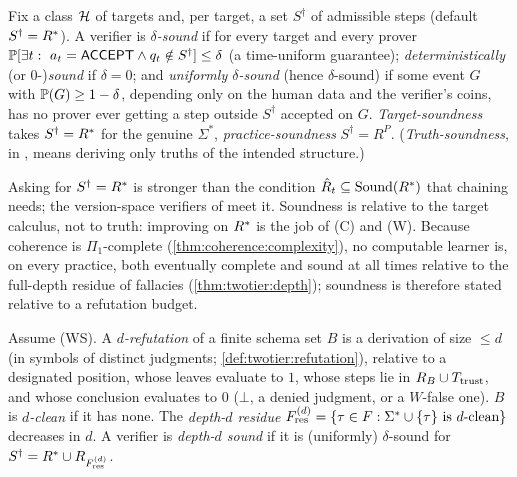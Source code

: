 \begin{definition}[Soundness]\label{def:setting:soundness}
Fix a class $\mathcal{H}$ of targets and, per target, a set $S^\dagger$ of admissible steps
(default $S^\dagger=R^{*}$). A verifier is \emph{$\delta$-sound} if for every
target and every prover
$\mathbb{P}[\exists t:\ a_t=\textsf{ACCEPT}\wedge q_t\notin S^\dagger]\le\delta$ (a
time-uniform guarantee); \emph{deterministically} (or $0$-)\emph{sound} if
$\delta=0$; and \emph{uniformly $\delta$-sound} (hence $\delta$-sound) if some
event $G$ with $\mathbb{P}(G)\ge1-\delta$, depending only on the human data and the verifier's coins,
has no prover ever getting a step outside $S^\dagger$ accepted on $G$.
\emph{Target-soundness} takes $S^\dagger=R^{*}$ for the genuine $\Sigma^*$,
\emph{practice-soundness} $S^\dagger=R^P$. (\emph{Truth-soundness}, in
, means deriving only truths of the intended structure.)
\end{definition}

Asking for $S^\dagger=R^{*}$ is stronger than the condition
$\hat R_t\subseteq\mathrm{Sound}(R^{*})$ that chaining needs; the version-space
verifiers of  meet it. Soundness is relative to the
target calculus, not to truth: improving on $R^{*}$ is the job of (C) and (W).
Because coherence is $\Pi_1$-complete (\cref{thm:coherence:complexity}), no
computable learner is, on every practice, both eventually complete and sound at
all times relative to the full-depth residue of fallacies
(\cref{thm:twotier:depth}); soundness is therefore stated relative to a refutation
budget.

\begin{definition}\label{def:setting:depth}
Assume (WS). A \emph{$d$-refutation} of a finite schema set $B$ is a derivation of
size $\le d$ (in symbols of distinct judgments;
\cref{def:twotier:refutation}), relative to a designated position, whose leaves
evaluate to $1$, whose steps lie in $R_B\cup T_{\mathrm{trust}}$, and whose conclusion
evaluates to $0$ ($\bot$, a denied judgment, or a $W$-false one). $B$ is
\emph{$d$-clean} if it has none. The \emph{depth-$d$ residue}
$F^{(d)}_{\mathrm{res}}=\{\tau\in F:\Sigma^*\cup\{\tau\}\text{ is }d\text{-clean}\}$ decreases
in $d$. A verifier is \emph{depth-$d$ sound} if it is (uniformly) $\delta$-sound
for $S^\dagger=R^{*}\cup R_{F^{(d)}_{\mathrm{res}}}$.
\end{definition}

